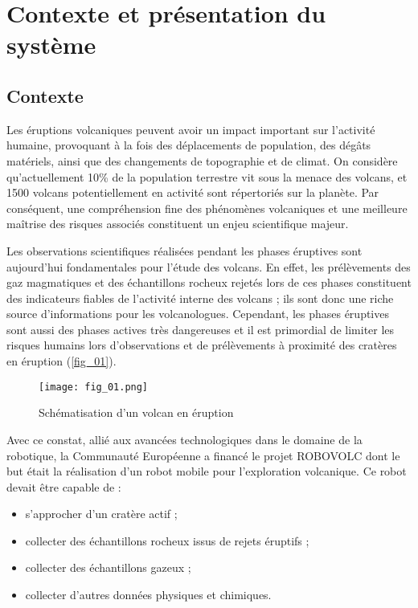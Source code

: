 % 
% 
\section{Contexte et présentation du système}
\subsection{Contexte}



Les éruptions volcaniques peuvent avoir un impact important sur l'activité humaine, provoquant à
la fois des déplacements de population, des dégâts matériels, ainsi que des changements de
topographie et de climat. On considère qu'actuellement 10\% de la population terrestre vit sous la
menace des volcans, et 1500 volcans potentiellement en activité sont répertoriés sur la planète.
Par conséquent, une compréhension fine des phénomènes volcaniques et une meilleure maîtrise
des risques associés constituent un enjeu scientifique majeur.

Les observations scientifiques réalisées pendant les phases éruptives sont aujourd'hui
fondamentales pour l'étude des volcans. En effet, les prélèvements des gaz magmatiques et des
échantillons rocheux rejetés lors de ces phases constituent des indicateurs fiables de l'activité
interne des volcans ; ils sont donc une riche source d'informations pour les volcanologues.
Cependant, les phases éruptives sont aussi des phases actives très dangereuses et il est
primordial de limiter les risques humains lors d'observations et de prélèvements à proximité des
cratères en éruption (\autoref{fig_01}). 



\begin{figure}[H]
\centering
\texttt{[image: fig\_01.png]}
\caption{Schématisation d'un volcan en éruption \label{fig_01}}
\end{figure}


Avec ce constat, allié aux avancées technologiques dans le domaine de la robotique, la
Communauté Européenne a financé le projet ROBOVOLC dont le but était la réalisation d'un robot
mobile pour l'exploration volcanique. Ce robot devait être capable de :
\begin{itemize}
\item s'approcher d'un cratère actif ;
\item collecter des échantillons rocheux issus de rejets éruptifs ;
\item collecter des échantillons gazeux ;
\item collecter d'autres données physiques et chimiques.
\end{itemize}


